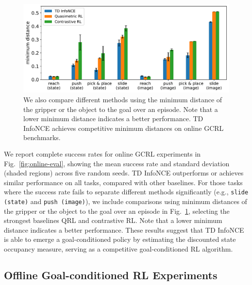 \documentclass{article} %
\begin{document}
\begin{figure}[t]
    \centering
    \includegraphics[width=\linewidth]{figures/learning_curves/online_distance_bar.pdf}
    \caption{We also compare different methods using the minimum distance of the gripper or the object to the goal over an episode. Note that a lower minimum distance indicates a better performance. TD InfoNCE achieves competitive minimum distances on online GCRL benchmarks.}
    \label{fig:online-eval-dist}
\end{figure}

We report complete success rates for online GCRL experiments in Fig.~\ref{fig:online-eval}, showing the mean success rate and standard deviation (shaded regions) across five random seeds. TD InfoNCE outperforms or achieves similar performance on all tasks, compared with other baselines. For those tasks where the success rate fails to separate different methods significantly (e.g., \texttt{slide (state)} and \texttt{push (image)}), we include comparisons using minimum distances of the gripper or the object to the goal over an episode in Fig.~\ref{fig:online-eval-dist}, selecting the strongest baselines QRL and contrastive RL. Note that a lower minimum distance indicates a better performance. These results suggest that TD InfoNCE is able to emerge a goal-conditioned policy by estimating the discounted state occupancy measure, serving as a competitive goal-conditioned RL algorithm.

\subsection{Offline Goal-conditioned RL Experiments}
\label{appendix:offline-details}
\end{document}

